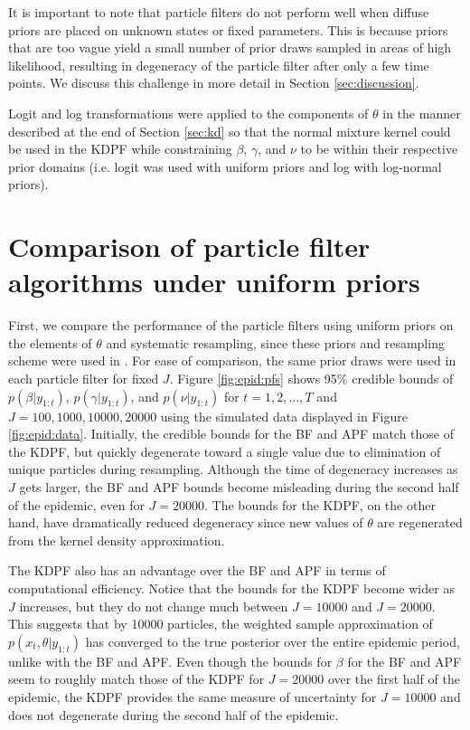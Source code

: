 It is important to note that particle filters do not perform well when diffuse priors are placed on unknown states or fixed parameters. This is because priors that are too vague yield a small number of prior draws sampled in areas of high likelihood, resulting in degeneracy of the particle filter after only a few time points. We discuss this challenge in more detail in Section \ref{sec:discussion}.

Logit and log transformations were applied to the components of $\theta$ in the manner described at the end of Section \ref{sec:kd} so that the normal mixture kernel could be used in the KDPF while constraining $\beta$, $\gamma$, and $\nu$ to be within their respective prior domains (i.e. logit was used with uniform priors and log with log-normal priors).

\section{Comparison of particle filter algorithms under uniform priors} \label{sec:epid:unif}

First, we compare the performance of the particle filters using uniform priors on the elements of $\theta$ and systematic resampling, since these priors and resampling scheme were used in \citet{skvortsov2012monitoring}. For ease of comparison, the same prior draws were used in each particle filter for fixed $J$. Figure \ref{fig:epid:pfs} shows 95\% credible bounds of $p(\beta|y_{1:t})$, $p(\gamma|y_{1:t})$, and $p(\nu|y_{1:t})$ for $t = 1,2,\ldots,T$ and $J = 100, 1000, 10000, 20000$ using the simulated data displayed in Figure \ref{fig:epid:data}. Initially, the credible bounds for the BF and APF match those of the KDPF, but quickly degenerate toward a single value due to elimination of unique particles during resampling. Although the time of degeneracy increases as $J$ gets larger, the BF and APF bounds become misleading during the second half of the epidemic, even for $J = 20000$. The bounds for the KDPF, on the other hand, have dramatically reduced degeneracy since new values of $\theta$ are regenerated from the kernel density approximation.

The KDPF also has an advantage over the BF and APF in terms of computational efficiency. Notice that the bounds for the KDPF become wider as $J$ increases, but they do not change much between $J = 10000$ and $J = 20000$. This suggests that by 10000 particles, the weighted sample approximation of $p(x_t,\theta|y_{1:t})$ has converged to the true posterior over the entire epidemic period, unlike with the BF and APF. Even though the bounds for $\beta$ for the BF and APF seem to roughly match those of the KDPF for $J = 20000$ over the first half of the epidemic, the KDPF provides the same measure of uncertainty for $J = 10000$ and does not degenerate during the second half of the epidemic.

